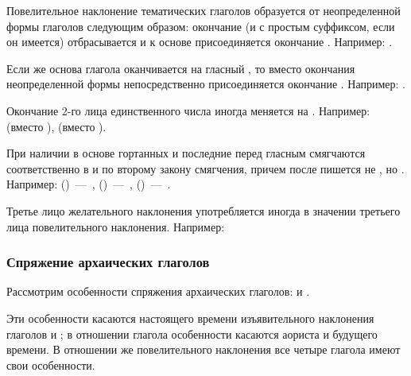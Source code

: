 \documentclass[11pt,a4paper,oneside]{memoir}
\newcommand{\hspca}{\hspace{2.4em}}
\begin{document}
    Повелительное наклонение тематических глаголов образуется от неопределенной формы глаголов следующим образом: окончание {} (и с простым суффиксом, если он имеется) отбрасывается и к основе присоединяется окончание {}. Например: {}.
    
    Если же основа глагола оканчивается на гласный {}, то вместо окончания неопределенной формы {} непосредственно присоединяется окончание {}. Например: {}.
    
    Окончание 2-го лица единственного числа {} иногда меняется на {}. Например: {} (вместо {}), {} (вместо {}).
    
    При наличии в основе гортанных {} и {} последние перед гласным {} смягчаются соответственно в {} и {} по второму закону смягчения, причем после {} пишется не {}, но {}. Например: {} ({})~---~{}, {} ({})~---~{}, {} ({})~---~{}.
    
    Третье лицо желательного наклонения употребляется иногда в значении третьего лица повелительного наклонения. Например:
    
    \bigskip\autorows{l}{1}{l}{
        \hspca{{\slv{Да бꙋ́детъ свѣ́тъ}} (Быт. 1, 3)}
    }

                \subsubsection{Спряжение архаических глаголов}

    Рассмотрим особенности спряжения архаических глаголов: {} и {}.
    
    Эти особенности касаются настоящего времени изъявительного наклонения глаголов {} и {}; в отношении глагола {} особенности касаются аориста и будущего времени. В отношении же повелительного наклонения все четыре глагола имеют свои особенности.
\end{document}
